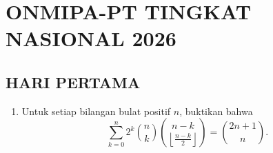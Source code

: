 \documentclass[12pt,twoside]{article}
\begin{document}
\pagebreak

\section{ONMIPA-PT TINGKAT NASIONAL 2026}
\subsection{HARI PERTAMA}
\begin{enumerate}
    \item Untuk setiap bilangan bulat positif $n$, buktikan bahwa
          \[
              \sum_{k=0}^{n}
              2^k \binom{n}{k}
              \binom{\,n-k\,}{\left\lfloor \frac{n-k}{2}\right\rfloor}
              =
              \binom{2n+1}{n}.
          \]


\end{enumerate}
\end{document}
